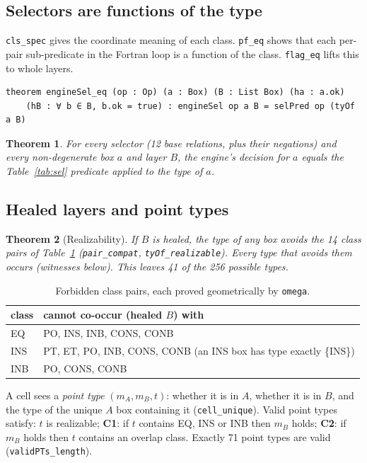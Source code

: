 \documentclass[11pt]{article}
\newtheorem{theorem}{Theorem}
\begin{document}
\subsection{Selectors are functions of the type}
\texttt{cls\_spec} gives the coordinate meaning of each class. \texttt{pf\_eq} shows that each per-pair sub-predicate in the Fortran loop is a function of the class. \texttt{flag\_eq} lifts this to whole layers.
\begin{lstlisting}[language=Lean]
theorem engineSel_eq (op : Op) (a : Box) (B : List Box) (ha : a.ok)
    (hB : ∀ b ∈ B, b.ok = true) : engineSel op a B = selPred op (tyOf a B)
\end{lstlisting}
\begin{theorem}\label{thm:sel}
For every selector (12 base relations, plus their negations) and every non-degenerate box $a$ and layer $B$, the engine's decision for $a$ equals the Table~\ref{tab:sel} predicate applied to the type of $a$.
\end{theorem}

\subsection{Healed layers and point types}
\begin{theorem}[Realizability]\label{thm:real}
If $B$ is healed, the type of any box avoids the 14 class pairs of Table~\ref{tab:forb} (\texttt{pair\_compat}, \texttt{tyOf\_realizable}). Every type that avoids them occurs (witnesses below). This leaves 41 of the 256 possible types.
\end{theorem}
\begin{table}[h]
\centering\small
\begin{tabular}{ll}
\toprule
class & cannot co-occur (healed $B$) with\\
\midrule
EQ & PO, INS, INB, CONS, CONB\\
INS & PT, ET, PO, INB, CONS, CONB \quad (an INS box has type exactly \{INS\})\\
INB & PO, CONS, CONB\\
\bottomrule
\end{tabular}
\caption{Forbidden class pairs, each proved geometrically by \texttt{omega}.}
\label{tab:forb}
\end{table}
A cell sees a \emph{point type} $(m_A, m_B, t)$: whether it is in $A$, whether it is in $B$, and the type of the unique $A$ box containing it (\texttt{cell\_unique}). Valid point types satisfy: $t$ is realizable; \textbf{C1}: if $t$ contains EQ, INS or INB then $m_B$ holds; \textbf{C2}: if $m_B$ holds then $t$ contains an overlap class. Exactly 71 point types are valid (\texttt{validPTs\_length}).
\end{document}
